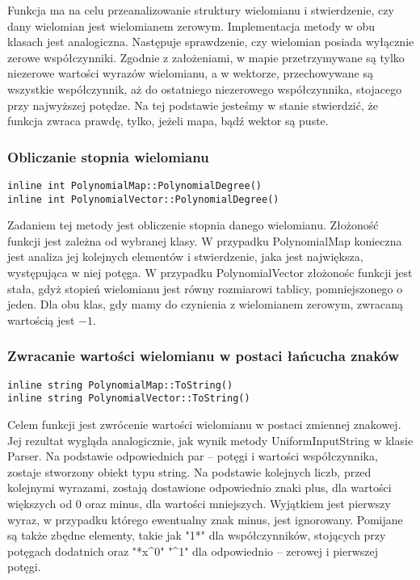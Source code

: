 Funkcja ma na celu przeanalizowanie struktury wielomianu i stwierdzenie, czy dany wielomian jest wielomianem zerowym. Implementacja metody w obu klasach jest analogiczna. Następuje sprawdzenie, czy wielomian posiada wyłącznie zerowe współczynniki. Zgodnie z założeniami, w mapie przetrzymywane są tylko niezerowe wartości wyrazów wielomianu, a w wektorze, przechowywane są wszystkie współczynnik, aż do ostatniego niezerowego współczynnika, stojacego przy najwyższej potędze. Na tej podstawie jesteśmy w stanie stwierdzić, że funkcja zwraca prawdę, tylko, jeżeli mapa, bądź wektor są puste.

\subsubsection{Obliczanie stopnia wielomianu}
\begin{lstlisting}
inline int PolynomialMap::PolynomialDegree()
inline int PolynomialVector::PolynomialDegree()
\end{lstlisting}

Zadaniem tej metody jest obliczenie stopnia danego wielomianu. Złożoność funkcji jest zależna od wybranej klasy. W przypadku PolynomialMap konieczna jest analiza jej kolejnych elementów i stwierdzenie, jaka jest największa, występująca w niej potęga. W przypadku PolynomialVector złożonośc funkcji jest stała, gdyż stopień wielomianu jest równy rozmiarowi tablicy, pomniejszonego o jeden. Dla obu klas, gdy mamy do czynienia z wielomianem zerowym, zwracaną wartością jest $-1$.

\subsubsection{Zwracanie wartości wielomianu w postaci łańcucha znaków}
\begin{lstlisting}
inline string PolynomialMap::ToString()
inline string PolynomialVector::ToString()
\end{lstlisting}

Celem funkcji jest zwrócenie wartości wielomianu w postaci zmiennej znakowej. Jej rezultat wygląda analogicznie, jak wynik metody UniformInputString w klasie Parser. Na podstawie odpowiednich par – potęgi i wartości współczynnika, zostaje stworzony obiekt typu string. Na podstawie kolejnych liczb, przed kolejnymi wyrazami, zostają dostawione odpowiednio znaki plus, dla wartości większych od $0$ oraz minus, dla wartości mniejszych. Wyjątkiem jest pierwszy wyraz, w przypadku którego ewentualny znak minus, jest ignorowany. Pomijane są także zbędne elementy, takie jak "1*" dla współczynników, stojących przy potęgach dodatnich oraz "*x\^{}0" "\^{}1" dla odpowiednio – zerowej i pierwszej potęgi.

